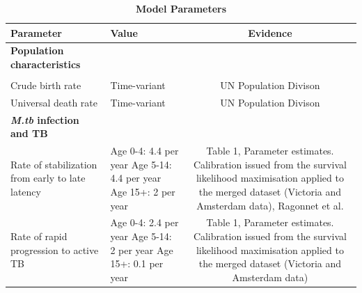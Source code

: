 \documentclass{article}
\begin{document}
\begin{table}[!htp]
    \caption{\textbf{Model Parameters}}
    \label{tab:parameter}
    \begin{tabularx}{\textwidth}{ X  X  c }
        \hline
        \textbf{Parameter} & \textbf{Value} & \textbf{Evidence} \\
        \hline
        \textbf{Population characteristics} & & \\
         \\
        Crude birth rate  & Time-variant & UN Population Divison \\
        Universal death rate & Time-variant & UN Population Divison \\
        \hline
        \textbf{\emph{M.tb} infection and TB} \\
        Rate of stabilization from early to late latency &    
        \begin{minipage}[t]{0.3\textwidth}
            Age 0-4: 4.4 per year \newline
            Age 5-14: 4.4 per year \newline
            Age 15+: 2 per year \newline
        \end{minipage}
        & 
        \begin{minipage}[t]{0.4\textwidth}
            Table 1, Parameter estimates. Calibration issued from the survival likelihood maximisation applied 
            to the merged dataset (Victoria and Amsterdam data), Ragonnet et al.\cite{ragonnet-2017}
        \end{minipage} \\
        Rate of rapid progression to active TB & 
        \begin{minipage}[t]{0.3\textwidth}
            Age 0-4: 2.4 per year \newline
            Age 5-14: 2 per year \newline
            Age 15+: 0.1 per year \newline
        \end{minipage}
        & 
        \begin{minipage}[t]{0.4\textwidth}
            Table 1, Parameter estimates. Calibration issued from the survival likelihood maximisation applied 
            to the merged dataset (Victoria and Amsterdam data) \cite{ragonnet-2017}
        \end{minipage}  \\

\end{tabularx}
\end{table}
\end{document}
